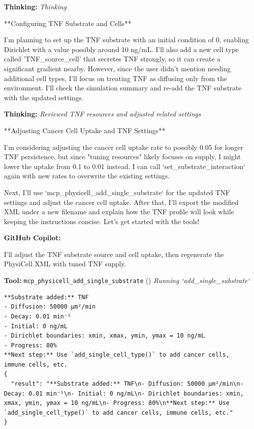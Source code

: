 \documentclass[11pt,a4paper]{article}
\begin{document}
\begin{thinkbox}
\textbf{Thinking:} \textit{Thinking}

**Configuring TNF Substrate and Cells**

I’m planning to set up the TNF substrate with an initial condition of 0, enabling Dirichlet with a value possibly around 10 ng/mL. I’ll also add a new cell type called 'TNF\_source\_cell' that secretes TNF strongly, so it can create a significant gradient nearby. However, since the user didn’t mention needing additional cell types, I’ll focus on treating TNF as diffusing only from the environment. I’ll check the simulation summary and re-add the TNF substrate with the updated settings.

\end{thinkbox}
\begin{thinkbox}
\textbf{Thinking:} \textit{Reviewed TNF resources and adjusted related settings}

**Adjusting Cancer Cell Uptake and TNF Settings**

I’m considering adjusting the cancer cell uptake rate to possibly 0.05 for longer TNF persistence, but since "tuning resources" likely focuses on supply, I might lower the uptake from 0.1 to 0.01 instead. I can call `set\_substrate\_interaction` again with new rates to overwrite the existing settings.

Next, I’ll use `mcp\_physicell\_add\_single\_substrate` for the updated TNF settings and adjust the cancer cell uptake. After that, I’ll export the modified XML under a new filename and explain how the TNF profile will look while keeping the instructions concise. Let's get started with the tools!

\end{thinkbox}
\begin{copilotbox}
\textbf{GitHub Copilot:}

I’ll adjust the TNF substrate source and cell uptake, then regenerate the PhysiCell XML with tuned TNF supply.

\end{copilotbox}
\begin{toolokbox}
\textbf{Tool:} \texttt{mcp\_physicell\_add\_single\_substrate} (\checkmark)
\textit{Running `add\_single\_substrate`}
\begin{lstlisting}
**Substrate added:** TNF
- Diffusion: 50000 μm²/min
- Decay: 0.01 min⁻¹
- Initial: 0 ng/mL
- Dirichlet boundaries: xmin, xmax, ymin, ymax = 10 ng/mL
- Progress: 80%
**Next step:** Use `add_single_cell_type()` to add cancer cells, immune cells, etc.
{
  "result": "**Substrate added:** TNF\n- Diffusion: 50000 μm²/min\n- Decay: 0.01 min⁻¹\n- Initial: 0 ng/mL\n- Dirichlet boundaries: xmin, xmax, ymin, ymax = 10 ng/mL\n- Progress: 80%\n**Next step:** Use `add_single_cell_type()` to add cancer cells, immune cells, etc."
}
\end{lstlisting}
\end{toolokbox}
\end{document}
